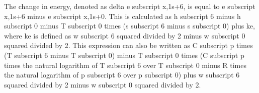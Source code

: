 The change in energy, denoted as delta e subscript x,1s+6, is equal to e subscript x,1s+6 minus e subscript x,1s+0. This is calculated as h subscript 6 minus h subscript 0 minus T subscript 0 times (s subscript 6 minus s subscript 0) plus ke, where ke is defined as w subscript 6 squared divided by 2 minus w subscript 0 squared divided by 2. This expression can also be written as C subscript p times (T subscript 6 minus T subscript 0) minus T subscript 0 times (C subscript p times the natural logarithm of T subscript 6 over T subscript 0 minus R times the natural logarithm of p subscript 6 over p subscript 0) plus w subscript 6 squared divided by 2 minus w subscript 0 squared divided by 2.